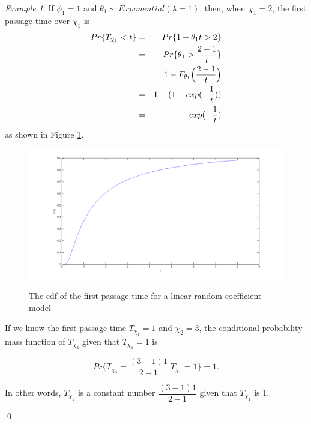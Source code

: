 \documentclass[10pt,a4paper]{article}
\theoremstyle{remark}
\newtheorem{example}{Example}
\begin{document}
\begin{example}
If $\phi_1=1$ and $\theta_1\sim Exponential (\lambda=1)$, then, when $\chi_1=2$, the first passage time over $\chi_1$ is
\begin{eqnarray} 
Pr\{T_{\chi_1} <t\}  & = & Pr\{1+\theta_{1}t > 2 \} \notag\\
 & = &  Pr\{\theta_{1} > \frac{2-1}{t} \} \notag\\
& = & 1- F_{\theta_{1}}\Big( \frac{2-1}{t}\Big) \notag\\
& = & 1- (1-exp(-\dfrac{1}{t})) \notag\\
& = & exp(-\dfrac{1}{t})
\end{eqnarray}
as shown in Figure \ref{pic:example3.2}.
\begin{figure}[h!!!]  %
  \centering
  \includegraphics[width=6in]{example32.png}\\
  \footnotesize
  \caption{ \footnotesize{The cdf of the first passage time for a linear random coefficient model} }\label{pic:example3.2}
\end{figure}
If we know the first passage time $T_{\chi_1}=1$ and $\chi_2=3$, the conditional probability mass function of $T_{\chi_{2}}$ given that $T_{\chi_1}=1$ is

\begin{equation*}
Pr\{T_{\chi_{2}}=\dfrac{(3-1)1}{2-1} | T_{\chi_{1}}=1 \} =1.
\end{equation*} 

In other words, $T_{\chi_2}$ is a constant number $\dfrac{(3-1)1}{2-1}$ given that $T_{\chi_1}$ is 1.
 
\qed
\end{example}
\end{document}
